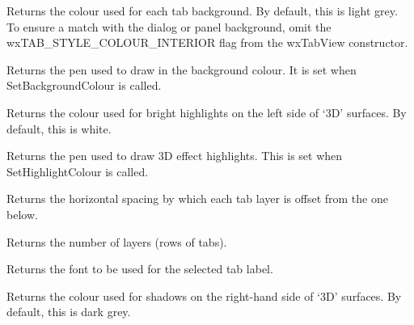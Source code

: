 

Returns the colour used for each tab background. By default, this is
light grey. To ensure a match with the dialog or panel background, omit
the wxTAB\_STYLE\_COLOUR\_INTERIOR flag from the wxTabView constructor. 



Returns the pen used to draw in the background colour. It is set when
SetBackgroundColour is called. 



Returns the colour used for bright highlights on the left side of `3D' surfaces. By default, this is white.



Returns the pen used to draw 3D effect highlights. This is set when
SetHighlightColour is called. 



Returns the horizontal spacing by which each tab layer is offset from the one below.



Returns the number of layers (rows of tabs).



Returns the font to be used for the selected tab label.



Returns the colour used for shadows on the right-hand side of `3D' surfaces. By default, this is dark grey.



